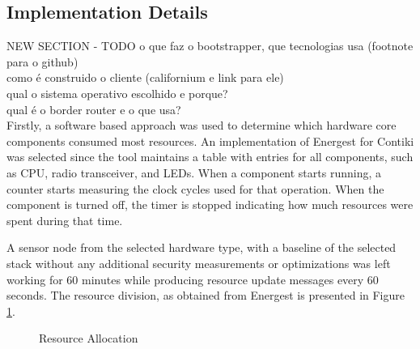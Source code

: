 \documentclass{sig-alternate-05-2015}
\newcommand{\pie}[3][]{
    \begin{scope}[#1]
    \pgfmathsetmacro{\curA}{90}
    \pgfmathsetmacro{\r}{1}
    \def\c{(0,0)}
    \node[pie title] at (90:1.3) {#2};
    \foreach \v/\s in{#3}{
        \pgfmathsetmacro{\deltaA}{\v/100*360}
        \pgfmathsetmacro{\nextA}{\curA + \deltaA}
        \pgfmathsetmacro{\midA}{(\curA+\nextA)/2}

        \path[slice,\s] \c
            -- +(\curA:\r)
            arc (\curA:\nextA:\r)
            -- cycle;
        \pgfmathsetmacro{\d}{max((\deltaA * -(.5/50) + 1) , .5)}

        \begin{pgfonlayer}{foreground}
        \path \c -- node[pos=\d,pie values,values of \s]{$\v\%$} +(\midA:\r);
        \end{pgfonlayer}

        \global\let\curA\nextA
    }
    \end{scope}
}
\newcommand{\legend}[2][]{
    \begin{scope}[#1]
    \path
        \foreach \n/\s in {#2}
            {
                  ++(0,-10pt) node[\s,legend box] {} +(5pt,0) node[legend label] {\n}
            }
    ;
    \end{scope}
}
\begin{document}
\subsection{Implementation Details}
\label{sec:implementation_details}

NEW SECTION - TODO
o que faz o bootstrapper, que tecnologias usa (footnote para o github)\\
como é construido o cliente (californium e link para ele)\\
qual o sistema operativo escolhido e porque?\\
qual é o border router e o que usa?\\

Firstly, a software based approach was used to determine which hardware core components consumed most resources. An implementation of Energest\cite{Dunkels2007} for Contiki was selected since the tool maintains a table with entries for all components, such as CPU, radio transceiver, and LEDs. When a component starts running, a counter starts measuring the clock cycles used for that operation. When the component is turned off, the timer is stopped indicating how much resources were spent during that time.

A sensor node from the selected hardware type, with a baseline of the selected stack without any additional security measurements or optimizations was left working for 60 minutes while producing resource update messages every 60 seconds. The resource division, as obtained from Energest is presented in Figure \ref{fig:resource_alloc}.

\begin{figure}
\centering
{}
\caption{Resource Allocation} \label{fig:resource_alloc}
\end{figure}
\end{document}
